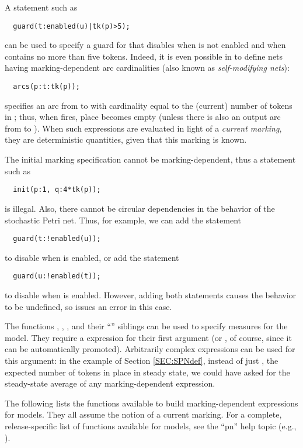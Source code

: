 A statement such as
\begin{lstlisting}
  guard(t:enabled(u)|tk(p)>5);
\end{lstlisting}
can be used to specify a guard
for  that disables  when  is not enabled and
when  contains no more than five tokens.
Indeed, it is even possible in {\smart} to define nets having marking-dependent
arc cardinalities \cite{1994ICATPN-Vararcs}
(also known as \emph{self-modifying nets}):
\begin{lstlisting}
  arcs(p:t:tk(p));
\end{lstlisting}
specifies an arc from  to  with
cardinality equal to the (current) number of tokens in ;
thus, when  fires, place  becomes empty
(unless there is also an output arc from  to ).
When such expressions are evaluated in light of a \emph{current marking},
they are deterministic quantities, given that this marking is known.

The initial marking specification cannot be marking-dependent, thus
a statement such as
\begin{lstlisting}
  init(p:1, q:4*tk(p));
\end{lstlisting}
is illegal.
Also, there cannot be circular dependencies in the behavior of the
stochastic Petri net.
Thus, for example, we can add the statement
\begin{lstlisting}
  guard(t:!enabled(u));
\end{lstlisting}
to disable  when  is enabled, or add the statement
\begin{lstlisting}
  guard(u:!enabled(t));
\end{lstlisting}
to disable  when  is enabled.
However, adding both statements causes the behavior to be undefined, so
{\smart} issues an error in this case.

The functions , , , and their
``'' siblings can be used to specify measures for the model.
They require a  expression for their first argument
(or , of course, since it can be automatically promoted).
Arbitrarily complex expressions can be used for this argument:
in the example of Section \ref{SEC:SPNdef},
instead of just , the expected number of tokens
in place  in steady state, we could have asked for the
steady-state average of any marking-dependent expression.

The following lists the functions available to build marking-dependent
expressions for  models.
They all assume the notion of a current marking.
For a complete,
release-specific list of functions available for  models,
see the ``pn'' help topic (e.g., ).

